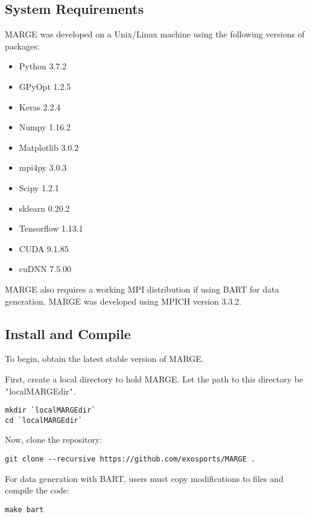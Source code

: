 \documentclass[letterpaper, 12pt]{article}
\begin{document}
\subsection{System Requirements}
\label{sec:requirements}

\noindent MARGE was developed on a Unix/Linux machine using the following 
versions of packages:

\begin{itemize}
\item Python 3.7.2
\item GPyOpt 1.2.5
\item Keras 2.2.4
\item Numpy 1.16.2
\item Matplotlib 3.0.2
\item mpi4py 3.0.3
\item Scipy 1.2.1
\item sklearn 0.20.2
\item Tensorflow 1.13.1
\item CUDA 9.1.85
\item cuDNN 7.5.00
\end{itemize}

\noindent MARGE also requires a working MPI distribution if using BART for 
data generation.  MARGE was developed using MPICH version 3.3.2.



\subsection{Install and Compile}
\label{sec:install}

\noindent To begin, obtain the latest stable version of MARGE.  

\noindent First, create a local directory to hold MARGE.  Let the path to this 
directory be \texttt{`}localMARGEdir\texttt{`}.

\begin{verbatim}
mkdir `localMARGEdir`
cd `localMARGEdir`
\end{verbatim}

\noindent Now, clone the repository:
\begin{verbatim}
git clone --recursive https://github.com/exosports/MARGE .
\end{verbatim}

\noindent For data generation with BART, users must copy modifications to files
and compile the code:

\begin{verbatim}
make bart
\end{verbatim}
\end{document}
